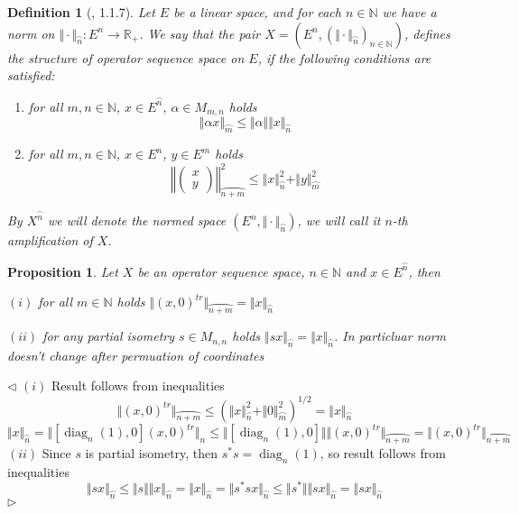 \documentclass[12pt]{article}
\newtheorem{proposition}[theorem]{Proposition}
\newtheorem{definition}[theorem]{Definition}
\newenvironment{proof}{\par $\triangleleft$}{$\triangleright$}
\begin{document}
\begin{definition}[\cite{LamOpFolgen}, 1.1.7]\label{DefSQSpace} Let $E$ be a
linear space, and for each $n\in\mathbb{N}$ we have a norm on $\Vert \cdot
\Vert_{\wideparen{n}}:E^n\to\mathbb{R}_+$. We say that the pair 
$X = (E^n, {(\Vert \cdot \Vert_{\wideparen{n}})}_{n \in \mathbb{N}})$, 
defines the structure of \textit{operator sequence} space on $E$, 
if the following conditions are satisfied:
\begin{enumerate}[label = (\roman*)]
    \item for all $m, n \in \mathbb{N}$, 
    $x \in E^{\wideparen{n}}$, $\alpha \in M_{m, n}$ holds
    $$
    \Vert 
        \alpha x 
    \Vert_{\wideparen{m}} 
    \leq \Vert \alpha \Vert  \Vert x \Vert_{\wideparen{n}}
    $$

    \item for all $m, n \in \mathbb{N}$, $x \in E^n$, $y \in E^m$ holds
    $$
    \left\Vert 
    \begin{pmatrix} x \\ y \end{pmatrix} 
    \right\Vert^2_{\wideparen{n + m}} 
    \leq   
    \Vert x \Vert_{\wideparen{n}}^2 + \Vert y \Vert_{\wideparen{m}}^2
    $$
\end{enumerate} 

By $X^{\wideparen{n}}$ we will denote the normed space $(E^n,\Vert \cdot
\Vert_{\wideparen{n}})$, we will call it $n$-th amplification of $X$.
\end{definition}

\begin{proposition}\label{PrRedundantAxiom} Let $X$ be an operator sequence
space, $n\in\mathbb{N}$ and $x\in E^{\wideparen{n}}$, then

$(i)$ for all $m\in\mathbb{N}$ holds 
$\Vert {(x, 0)}^{tr}\Vert_{\wideparen{n + m}}=\Vert x\Vert_{\wideparen{n}}$

$(ii)$ for any partial isometry $s\in M_{n,n}$ holds $\Vert
sx\Vert_{\wideparen{n}}=\Vert x\Vert_{\wideparen{n}}$. In particluar norm
doesn't change after permuation of coordinates
\end{proposition}
\begin{proof} $(i)$ Result follows from inequalities
$$
\Vert {(x, 0)}^{tr}\Vert_{\wideparen{n + m}}
\leq 
{\left(
    \Vert x\Vert_{\wideparen{n}}^2+\Vert 0\Vert_{\wideparen{m}}^2
\right)}^{1/2}=\Vert x\Vert_{\wideparen{n}}
$$
$$
\Vert x\Vert_{\wideparen{n}}
=\Vert[\operatorname{diag}_n(1),0]{(x,0)}^{tr}\Vert_{n}
\leq
\Vert[\operatorname{diag}_n(1),0]\Vert\Vert{(x,0)}^{tr}\Vert_{\wideparen{n+m}}
=\Vert{(x,0)}^{tr}\Vert_{\wideparen{n+m}}
$$
$(ii)$ Since $s$ is partial isometry, then $s^*s=\operatorname{diag}_n(1)$, so
result follows from inequalities
$$
\Vert sx\Vert_{\wideparen{n}}
\leq\Vert s\Vert\Vert x\Vert_{\wideparen{n}}
=\Vert x\Vert_{\wideparen{n}}=
\Vert s^*sx\Vert_{\wideparen{n}}
\leq\Vert s^*\Vert\Vert sx\Vert_{\wideparen{n}}
=\Vert sx\Vert_{\wideparen{n}}
$$
\end{proof}
\end{document}
